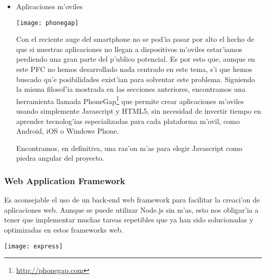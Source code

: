 \begin{itemize}
Otro punto a favor de Node.js es su gestor de paquetes NPM\footnote{\url{https://www.npmjs.org}}, con el cual se puede instalar cualquier extensi'on para back-end que exista en el repositorio
de forma r'apida y sencilla. Como se ha mencionado antes, Node.js est'a teniendo un crecimiento extremadamente r'apido, de forma que el n'umero
de m'odulos existentes para esta tecnolog'ia est'a superando a otros gigantes del sector en muy poco tiempo de vida\footnote{\url{http://modulecounts.com/}}.
Pero, sobretodo, lo m'as importante es que el tiempo que se invierte en la programaci'on de front o back-end
tambi'en nos da experiencia en la otra parte, puesto que siempre estamos usando el mismo lenguaje.

\item Aplicaciones m'oviles
\begin{center}
\texttt{[image: phonegap]}
\end{center}

Con el reciente auge del smartphone no se pod'ia pasar por alto el hecho de que si nuestras aplicaciones no llegan a dispositivos m'oviles
estar'iamos perdiendo una gran parte del p'ublico potencial. Es por esto que, aunque en este PFC no hemos desarrollado nada centrado en
este tema, s'i que hemos buscado qu'e posibilidades exist'ian para solventar este problema. Siguiendo la misma filosof'ia mostrada en las
secciones anteriores, encontramos una herramienta llamada PhoneGap\footnote{\url{http://phonegap.com}} que permite crear aplicaciones m'oviles usando simplemente Javascript y
HTML5, sin necesidad de invertir tiempo en aprender tecnolog'ias especializadas para cada plataforma m'ovil, como Android, iOS o Windows Phone.

Encontramos, en definitiva, una raz'on m'as para elegir Javascript como piedra angular del proyecto.


\end{itemize}


\subsubsection{Web Application Framework}
\label{sub:web_application_framework}
Es aconsejable el uso de un back-end web framework para facilitar la creaci'on de aplicaciones web. Aunque se puede utilizar Node.js sin m'as,
esto nos obligar'ia a tener que implementar muchas tareas repetibles que ya han sido solucionadas y optimizadas en estos frameworks web.

\begin{center}
\texttt{[image: express]}
\end{center}

